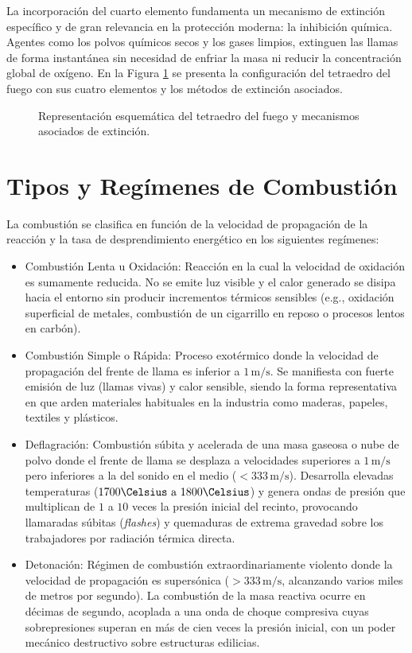 La incorporación del cuarto elemento fundamenta un mecanismo de extinción específico y de gran relevancia en la
protección moderna: la inhibición química. Agentes como los polvos químicos secos y los gases limpios, extinguen las
llamas de forma instantánea sin necesidad de enfriar la masa ni reducir la concentración global de oxígeno. En la Figura
\ref{fig.cap2:tetraedro} se presenta la configuración del tetraedro del fuego con sus cuatro elementos y los métodos de
extinción asociados.

\begin{figure}[!ht]
    \centering
    
    \caption{Representación esquemática del tetraedro del fuego y mecanismos asociados de extinción.}
    \label{fig.cap2:tetraedro}
\end{figure}

\section{Tipos y Regímenes de Combustión}
\label{sec.cap2:tipos_combustion}

La combustión se clasifica en función de la velocidad de propagación de la reacción y la tasa de desprendimiento
energético en los siguientes regímenes:

\begin{itemize}
    \item Combustión Lenta u Oxidación: Reacción en la cual la velocidad de oxidación es sumamente reducida. No se emite
      luz visible y el calor generado se disipa hacia el entorno sin producir incrementos térmicos sensibles (e.g.,
      oxidación superficial de metales, combustión de un cigarrillo en reposo o procesos lentos en carbón).
    \item Combustión Simple o Rápida: Proceso exotérmico donde la velocidad de propagación del frente de llama es
      inferior a $1\,\mathrm{m/s}$. Se manifiesta con fuerte emisión de luz (llamas vivas) y calor sensible, siendo la forma
      representativa en que arden materiales habituales en la industria como maderas, papeles, textiles y plásticos.
    \item Deflagración: Combustión súbita y acelerada de una masa gaseosa o nube de polvo donde el frente de llama se
      desplaza a velocidades superiores a $1\,\mathrm{m/s}$ pero inferiores a la del sonido en el medio
      ($< 333\,\mathrm{m/s}$). Desarrolla elevadas temperaturas ($1700\Celsius\text{ a }1800\Celsius$) y genera ondas de
      presión que multiplican de $1$ a $10$ veces la presión inicial del recinto, provocando llamaradas súbitas
      (\textit{flashes}) y quemaduras de extrema gravedad sobre los trabajadores por radiación térmica directa.
    \item Detonación: Régimen de combustión extraordinariamente violento donde la velocidad de propagación es supersónica
      ($> 333\,\mathrm{m/s}$, alcanzando varios miles de metros por segundo). La combustión de la masa reactiva ocurre en
      décimas de segundo, acoplada a una onda de choque compresiva cuyas sobrepresiones superan en más de cien veces la
      presión inicial, con un poder mecánico destructivo sobre estructuras edilicias.
\end{itemize}

